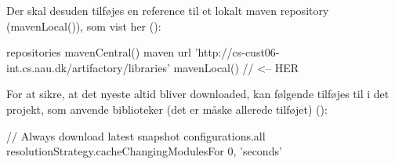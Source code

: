 Der skal desuden tilføjes en reference til et lokalt maven repository (mavenLocal()), som vist her ():

\begin{gradlecode}[caption=Dekleration af repositories,label=lst:decl_repo]
repositories {
    mavenCentral()
    maven {
        url 'http://cs-cust06-int.cs.aau.dk/artifactory/libraries'
    }
    mavenLocal() // <-- HER
}
\end{gradlecode}

For at sikre, at det nyeste  altid bliver downloaded, kan følgende tilføjes til  i det projekt, som anvende biblioteker (det er måske allerede tilføjet) ():

\begin{gradlecode}[caption=Kode til at altid at bruge det nyeste snapshot,label=lst:always_newest_snapshot]
// Always download latest snapshot
configurations.all {
    resolutionStrategy.cacheChangingModulesFor 0, 'seconds'
}
\end{gradlecode}